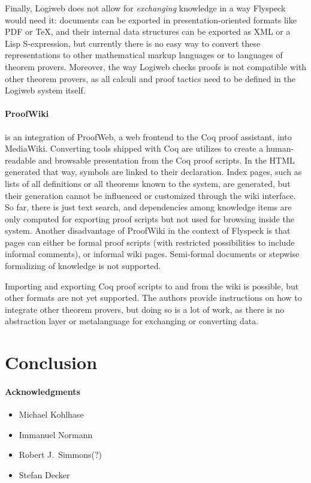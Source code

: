 \documentclass{llncs}
\begin{document}
Finally, Logiweb does not allow for \emph{exchanging} knowledge in a way Flyspeck would
need it: documents can be exported in presentation-oriented formats like PDF or \TeX{},
and their internal data structures can be exported as XML or a Lisp S-expression, but
currently there is no easy way to convert these representations to other mathematical
markup languages or to languages of theorem provers.  Moreover, the way Logiweb checks
proofs is not compatible with other theorem provers, as all calculi and proof tactics need
to be defined in the Logiweb system itself.

\paragraph{ProofWiki~\cite{CorKal:CoopReposFormalProofs07}} is an integration of ProofWeb,
a web frontend to the Coq proof assistant, into MediaWiki.  Converting tools shipped with
Coq are utilizes to create a human-readable and browsable presentation from the Coq proof
scripts.  In the HTML generated that way, symbols are linked to their declaration.  Index
pages, such as lists of all definitions or all theorems known to the system, are
generated, but their generation cannot be influenced or customized through the wiki
interface.  So far, there is just text search, and dependencies
among knowledge items are only computed for exporting proof scripts but not used for
browsing inside the system.  Another disadvantage of ProofWiki in the context of Flyspeck
is that pages can either be formal proof scripts (with restricted possibilities to include
informal comments), or informal wiki pages.  Semi-formal documents or stepwise formalizing
of knowledge is not supported.

Importing and exporting Coq proof scripts to and from the wiki is possible, but other
formats are not yet supported.  The authors provide instructions on how to integrate other
theorem provers, but doing so is a lot of work, as there is no abstraction layer or
metalanguage for exchanging or converting data.


\section{Conclusion}
\label{sec:conc}


\paragraph{Acknowledgments}
\label{sec:ack}

\begin{itemize}
\item Michael Kohlhase
\item Immanuel Normann
\item Robert J.\ Simmons(?)
\item Stefan Decker
\end{itemize}





\ednotemessage
\end{document}
